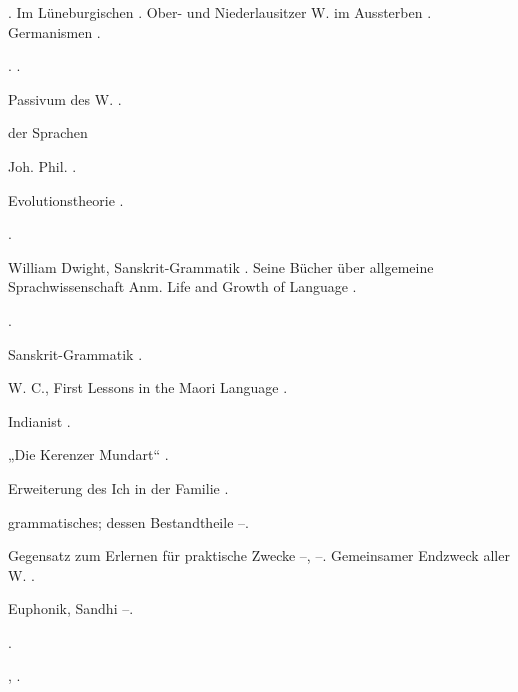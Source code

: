 \begin{register}
 \pageref{sp.54}. Im Lüneburgischen \pageref{sp.146}. Ober- und Niederlausitzer W. im Aussterben \pageref{sp.146}. Germanismen \pageref{sp.270}.


 \pageref{sp.103}.  \pageref{sp.318}.

 Passivum des W. \pageref{sp.102}.

 der Sprachen 

 Joh. Phil. \pageref{sp.26}.


 Evolutionstheorie \pageref{sp.216}.

 \pageref{sp.193}.

 William Dwight, Sanskrit-Grammatik \pageref{sp.34}. Seine Bücher über allgemeine Sprachwissenschaft \pageref{sp.52} Anm. Life and Growth of Language \pageref{sp.136}.

 \pageref{sp.103}.


 Sanskrit-Grammatik \pageref{sp.26}.

 W. C., First Lessons in the Maori Language \pageref{sp.463}.

 Indianist \pageref{sp.31}.

 „Die Kerenzer Mundart“ \pageref{sp.33}.

 Erweiterung des Ich in der Familie \pageref{sp.306}.

 grammatisches; dessen Bestandtheile \pageref{sp.84}–\pageref{sp.86}.

 Gegensatz zum Erlernen für praktische Zwecke \pageref{sp.7}–\pageref{sp.8}, \pageref{sp.17}–\pageref{sp.18}. Gemeinsamer Endzweck aller W. \pageref{sp.13}.



 Euphonik, Sandhi \pageref{sp.197}–\pageref{sp.205}.

 \pageref{sp.103}.

 \pageref{sp.150}, \pageref{sp.282}. 


\end{register}
